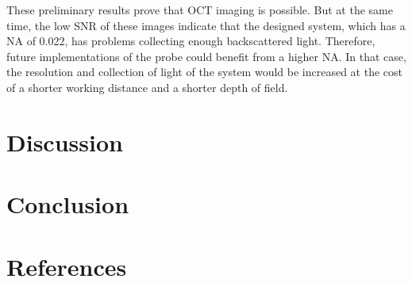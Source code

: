 \documentclass[10pt]{iopart}
\begin{document}
These preliminary results prove that OCT imaging is possible. But at the same time, the low SNR of these images indicate that the designed system, which has a NA of 0.022, has problems collecting enough backscattered light. Therefore, future implementations of the probe could benefit from a higher NA. In that case, the resolution and collection of light of the system would be increased at the cost of a shorter working distance and a shorter depth of field. 



\section{Discussion}

\section{Conclusion}

\section*{References}






\end{document}
